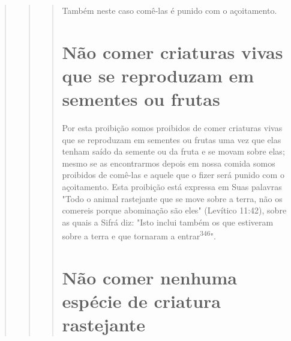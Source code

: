 \begin{quote}
\begin{quote}
\begin{quote}
Também neste caso comê-las é punido com o açoitamento.

\section{Não comer criaturas vivas que se reproduzam em sementes ou frutas}

Por esta proibição somos proibidos de comer criaturas vivas que se
reproduzam em sementes ou frutas uma vez que elas tenham saído da
semente ou da fruta e se movam sobre elas; mesmo se as encontrarmos
depois em nossa comida somos proibidos de comê-las e aquele que o fizer
será punido com o açoitamento. Esta proibição está expressa em Suas
palavras "Todo o animal ras­tejante que se move sobre a terra, não os
comereis porque abominação são eles" (Levítico 11:42), sobre as quais a
Sifrá diz: "Isto inclui também os que estive­ram sobre a terra e que
tornaram a entrar\textsuperscript{346}".

\section{Não comer nenhuma espécie de criatura rastejante}


\end{quote}
\end{quote}
\end{quote}
